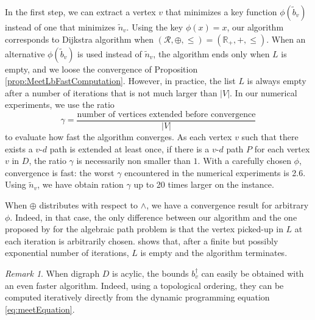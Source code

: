 \documentclass[11pt]{amsart}
\theoremstyle{plain}
\theoremstyle{remark}
\newtheorem{rem}{Remark}
\newcommand{\rplus}{\oplus}
\newcommand{\rleq}{\leqslant}
\newcommand{\rset}{\mathcal{R}}
\newcommand{\meet}{\wedge} \newcommand{\bigmeet}{\bigwedge}
\begin{document}
In the first step, we can extract a vertex $v$ that minimizes a key function $\phi(\tilde{b}_{v})$ instead of one that minimizes $\tilde{n}_{v}$. Using the key $\phi(x) = x$, our algorithm corresponds to Dijkstra algorithm 
when $(\rset, \rplus,\rleq) = (\mathbb{R}_{+},+,\leq)$. When an alternative $\phi(\tilde{b}_{v})$ is used instead of $\tilde{n}_{v}$, the algorithm ends only when $L$ is empty, and we loose the convergence of Proposition \ref{prop:MeetLbFastComputation}. However, in practice, the list $L$ is always empty after a number of iterations that is not much larger than $|V|$. In our numerical experiments, we use the ratio
\begin{equation}\label{eq:gamma}
	\gamma = \frac{\text{number of vertices extended before convergence}}{|V|}
\end{equation}
\noindent to evaluate how fast the algorithm converges. As each vertex $v$ such that there exists a $v$-$d$ path is extended at least once, if there is a $v$-$d$ path $P$ for each vertex $v$ in $D$, the ratio $\gamma$ is necessarily non smaller than $1$. With a carefully chosen $\phi$, convergence is fast: the worst $\gamma$ encountered in the numerical experiments is 2.6. Using $\tilde{n}_{v}$, we have obtain ration $\gamma$ up to 20 times larger on the instance. 


When $\rplus$ distributes with respect to $\meet$, we have a convergence result for arbitrary $\phi$. Indeed, in that case, the only difference between our algorithm and the one proposed by \citet{mohri2002semiring} for the algebraic path problem is that the vertex picked-up in $L$ at each iteration is arbitrarily chosen. \citet{mohri2002semiring} shows that, after a finite but possibly exponential number of iterations, $L$ is empty and the algorithm terminates.










\begin{rem}\label{rem:acyclicBounds}
 When digraph $D$ is acylic, the bounds $b_{v}^{\dagger}$ can easily be obtained with an even faster algorithm. Indeed, using a topological ordering, they can be computed iteratively directly from the dynamic programming equation \eqref{eq:meetEquation}.
\end{rem}
\end{document}
